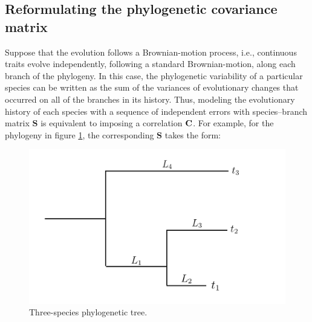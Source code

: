 \documentclass[12pt]{article}
\begin{document}

\subsection*{Reformulating the phylogenetic covariance matrix}


\newcommand{\bS}{{\mathbf S}}
\newcommand{\bJ}{{\mathbf J}}
\newcommand{\bB}{{\mathbf B}}
\newcommand{\bBadj}{{\mathbf B}_{\mbox{\tiny adj}}}
\newcommand{\bomega}{{\boldsymbol \omega}}
\newcommand{\bell}{{\boldsymbol \ell}}
\newcommand{\e}{{ \epsilon}}

Suppose that the evolution follows a Brownian-motion process, i.e., continuous traits evolve independently, following a standard Brownian-motion, along each branch of the phylogeny.
In this case, the phylogenetic variability of a particular species can be written as the sum of the variances of evolutionary changes that occurred on all of the branches in its history. 
Thus, modeling the evolutionary history of each species with a sequence of independent errors with species--branch matrix $\bS$ is equivalent to imposing a correlation ${\mathbf C}$.
For example, for the phylogeny in figure \ref{fig:tree}, the corresponding $\bS$ takes the form:

\begin{center}
\begin{figure}[H]
  \includegraphics[scale=0.8,page=1]{./figure/phylotree.png}
  \caption{Three-species phylogenetic tree.}
\label{fig:tree}
\end{figure}
\end{center}
\end{document}
